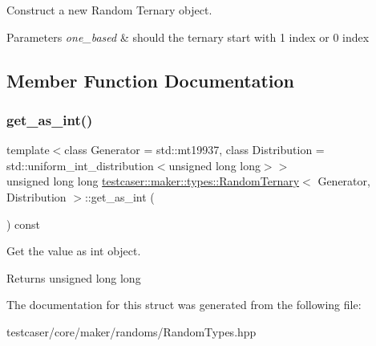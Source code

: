 Construct a new Random Ternary object. 


\begin{DoxyParams}{Parameters}
{\em one\+\_\+based} & should the ternary start with 1 index or 0 index \\
\hline
\end{DoxyParams}


\subsection{Member Function Documentation}
\mbox{\label{structtestcaser_1_1maker_1_1types_1_1RandomTernary_a4b6b6bd10a9b6a6578e7fcb8e0646019}} 
\subsubsection{\texorpdfstring{get\+\_\+as\+\_\+int()}{get\_as\_int()}}
{\footnotesize\ttfamily template$<$class Generator = std\+::mt19937, class Distribution = std\+::uniform\+\_\+int\+\_\+distribution$<$unsigned long long$>$$>$ \\
unsigned long long \hyperlink{structtestcaser_1_1maker_1_1types_1_1RandomTernary}{testcaser\+::maker\+::types\+::\+Random\+Ternary}$<$ Generator, Distribution $>$\+::get\+\_\+as\+\_\+int (\begin{DoxyParamCaption}{ }\end{DoxyParamCaption}) const\hspace{0.3cm}{\ttfamily [inline]}}



Get the value as int object. 

\begin{DoxyReturn}{Returns}
unsigned long long 
\end{DoxyReturn}


The documentation for this struct was generated from the following file\+:\begin{DoxyCompactItemize}
\item 
testcaser/core/maker/randoms/Random\+Types.\+hpp\end{DoxyCompactItemize}
